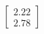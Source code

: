 \documentclass[preview]{standalone}
\begin{document}
\begin{align*}
\begin{bmatrix} 2.22 \\ 2.78 \end{bmatrix}
\end{align*}
\end{document}
